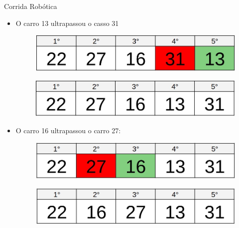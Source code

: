 \documentclass{beamer}
\begin{document}
\begin{frame}{Corrida Robótica}
\begin{itemize}
    \item O carro 13 ultrapassou o casso 31
        \begin{figure}[ht]
        \centering
        \includegraphics[width=.6\textwidth]{4.jpeg}
        \label{fig:exampleFig2}
        \end{figure}
        \begin{figure}[ht]
        \centering
        \includegraphics[width=.6\textwidth]{5.jpeg}
        \label{fig:exampleFig2}
        \end{figure}
    \item O carro 16 ultrapassou o carro 27:
        \begin{figure}[ht]
        \centering
        \includegraphics[width=.6\textwidth]{6.jpeg}
        \label{fig:exampleFig2}
        \end{figure}
        \begin{figure}[ht]
        \centering
        \includegraphics[width=.6\textwidth]{7.jpeg}
        \label{fig:exampleFig2}
        \end{figure}
\end{itemize}
\end{frame}
\end{document}
